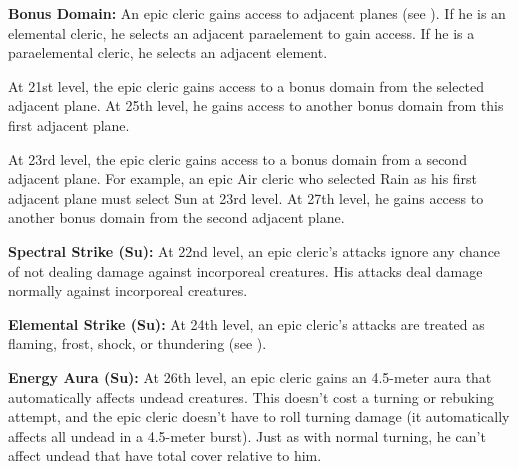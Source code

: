 \textbf{Bonus Domain:} An epic cleric gains access to adjacent planes (see ). If he is an elemental cleric, he selects an adjacent paraelement to gain access. If he is a paraelemental cleric, he selects an adjacent element.

At 21st level, the epic cleric gains access to a bonus domain from the selected adjacent plane. At 25th level, he gains access to another bonus domain from this first adjacent plane.

At 23rd level, the epic cleric gains access to a bonus domain from a second adjacent plane. For example, an epic Air cleric who selected Rain as his first adjacent plane must select Sun at 23rd level. At 27th level, he gains access to another bonus domain from the second adjacent plane.


\textbf{Spectral Strike (Su):} At 22nd level, an epic cleric's attacks ignore any chance of not dealing damage against incorporeal creatures. His attacks deal damage normally against incorporeal creatures.

\textbf{Elemental Strike (Su):} At 24th level, an epic cleric's attacks are treated as flaming, frost, shock, or thundering (see ).


\textbf{Energy Aura (Su):} At 26th level, an epic cleric gains an 4.5-meter aura that automatically affects undead creatures. This doesn't cost a turning or rebuking attempt, and the epic cleric doesn't have to roll turning damage (it automatically affects all undead in a 4.5-meter burst). Just as with normal turning, he can't affect undead that have total cover relative to him.

